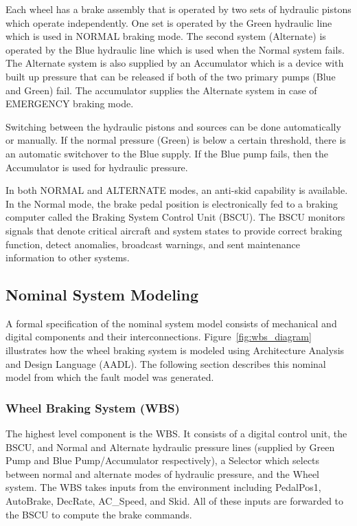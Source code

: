 Each wheel has a brake assembly that is operated by two sets of hydraulic pistons which operate independently. One set is operated by the Green hydraulic line which is used in NORMAL braking mode. The second system (Alternate) is operated by the Blue hydraulic line which is used when the Normal system fails. The Alternate system is also supplied by an Accumulator which is a device with built up pressure that can be released if both of the two primary pumps (Blue and Green) fail. The accumulator supplies the Alternate system in case of EMERGENCY braking mode. 

Switching between the hydraulic pistons and sources can be done automatically or manually. If the normal pressure (Green) is below a certain threshold, there is an automatic switchover to the Blue supply. If the Blue pump fails, then the Accumulator is used for hydraulic pressure. 

In both NORMAL and ALTERNATE modes, an anti-skid capability is available. In the Normal mode, the brake pedal position is electronically fed to a braking computer called the Braking System Control Unit (BSCU). The BSCU monitors signals that denote critical aircraft and system states to provide correct braking function, detect anomalies, broadcast warnings, and sent maintenance information to other systems. 

\subsection{Nominal System Modeling}
A formal specification of the nominal system model consists of mechanical and digital components and their interconnections. Figure~\ref{fig:wbs_diagram} illustrates how the wheel braking system is modeled using Architecture Analysis and Design Language (AADL). The following section describes this nominal model from which the fault model was generated. 

\subsubsection{Wheel Braking System (WBS)}
The highest level component is the WBS. It consists of a digital control unit, the BSCU, and Normal and Alternate hydraulic pressure lines (supplied by Green Pump and Blue Pump/Accumulator respectively), a Selector which selects between normal and alternate modes of hydraulic pressure, and the Wheel system. The WBS takes inputs from the environment including PedalPos1, AutoBrake, DecRate, AC\_Speed, and Skid. All of these inputs are forwarded to the BSCU to compute the brake commands.

